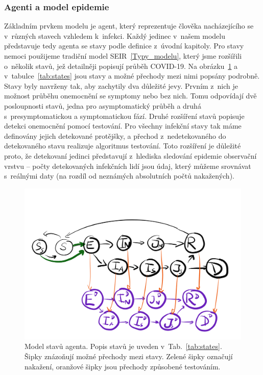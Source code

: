 \subsubsection*{Agenti a model epidemie}

Základním prvkem modelu je agent, který reprezentuje člověka nacházejícího se v~různých stavech vzhledem k~infekci. Každý jedinec v~našem modelu představuje tedy agenta se stavy podle definice z~úvodní kapitoly. Pro stavy nemoci použijeme tradiční model SEIR~\ref{Typy_modelu}, který jsme rozšířili o~několik stavů, jež detailněji popisují průběh COVID-19. Na obrázku~\ref{fig:model-states} a v~tabulce~\ref{tab:states} jsou stavy a možné přechody mezi nimi popsány podrobně. Stavy byly navrženy tak, aby zachytily dva důležité jevy. Prvním z~nich je možnost průběhu onemocnění se symptomy nebo bez nich. Tomu odpovídají dvě posloupnosti stavů, jedna pro asymptomatický průběh a druhá s~presymptomatickou a symptomatickou fází. Druhé rozšíření stavů popisuje detekci onemocnění pomocí testování. Pro všechny infekční stavy tak máme definovány jejich detekované protějšky, a přechod z~nedetekovaného do detekovaného stavu realizuje algoritmus testování. Toto rozšíření je důležité proto, že detekovaní jedinci představují z~hlediska sledování epidemie observační vrstvu -- počty detekovaných infekčních lidí jsou údaj, který můžeme srovnávat s~reálnými daty (na rozdíl od neznámých absolutních počtů nakažených).

    

\begin{figure}%
\centerline{%
\includegraphics[width=0.99\columnwidth]{pic/epi08}%
}
\caption{Model stavů agenta. Popis stavů je uveden v~Tab.~\ref{tab:states}. Šipky znázoňují možné přechody mezi stavy. Zelené šipky označují nakažení, oranžové šipky jsou přechody způsobené testováním.}%
\label{fig:model-states}%
\end{figure}


